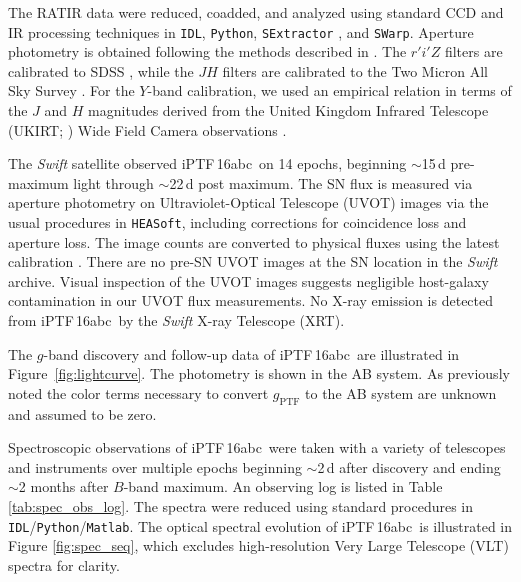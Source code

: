 \documentclass[twocolumn]{aastex61}
\newcommand{\abc}{iPTF\,16abc}
\begin{document}
The RATIR data were reduced, coadded, and analyzed using standard CCD and IR
processing techniques in \texttt{IDL}, \texttt{Python}, \texttt{SExtractor}
\citep{1996A&AS..117..393B}, and \texttt{SWarp}. Aperture photometry is
obtained following the methods described in \citet{2014AJ....148....2L}. The
$r'i'Z$ filters are calibrated to SDSS \citep{2014ApJS..211...17A}, while the
$JH$ filters are calibrated to the Two Micron All Sky Survey
\citep{2006AJ....131.1163S}. For the $Y$-band calibration, we used an
empirical relation in terms of the $J$ and $H$ magnitudes derived from the
United Kingdom Infrared Telescope (UKIRT; \citealt{2007A&A...467..777C}) Wide
Field Camera observations \citep{2009MNRAS.394..675H}.

The \textit{Swift} satellite observed \abc\ on 14 epochs, beginning
$\sim$15\,d pre-maximum light through $\sim$22\,d post maximum. The SN flux is
measured via aperture photometry on Ultraviolet-Optical Telescope (UVOT)
images via the usual procedures in \texttt{HEASoft}, including corrections for
coincidence loss and aperture loss. The image counts are converted to physical
fluxes using the latest calibration \citep{2011AIPC.1358..373B}. There are no
pre-SN UVOT images at the SN location in the \textit{Swift} archive. Visual
inspection of the UVOT images suggests negligible host-galaxy contamination in
our UVOT flux measurements. No X-ray emission is detected from \abc\ by the
\textit{Swift} X-ray Telescope (XRT).

The $g$-band discovery and follow-up data of \abc\ are illustrated in
Figure~\ref{fig:lightcurve}. The photometry is shown in the AB system. As
previously noted the color terms necessary to convert $g_\mathrm{PTF}$ to the
AB system are unknown and assumed to be zero.

Spectroscopic observations of \abc\ were taken with a variety of telescopes
and instruments over multiple epochs beginning $\sim$2\,d after
discovery and ending $\sim$2 months after $B$-band maximum. An
observing log is listed in Table \ref{tab:spec_obs_log}. The spectra were
reduced using standard procedures in
\texttt{IDL}/\texttt{Python}/\texttt{Matlab}. The optical spectral evolution
of \abc\ is illustrated in Figure \ref{fig:spec_seq}, which excludes
high-resolution Very Large Telescope (VLT) spectra for clarity.
\end{document}

